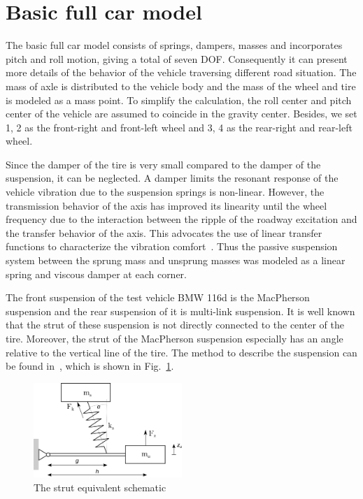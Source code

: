\section{Basic full car model}
\label{sec:full car model}
 
The basic full car model consists of springs, dampers, masses and incorporates pitch and roll motion, giving a total of seven \ac{DOF}.
%
Consequently it can present more details of the behavior of the vehicle traversing different road situation.
%
The mass of axle is distributed to the vehicle body and the mass of the wheel and tire is modeled as a mass point.
%
To simplify the calculation, the roll center and pitch center of the vehicle are assumed to coincide in the gravity center.
%
Besides, we set 1, 2 as the front-right and front-left wheel and 3, 4 as the rear-right and rear-left wheel.

Since the damper of the tire is very small compared to the damper of the suspension, it can be neglected.
%
A damper limits the resonant response of the vehicle vibration due to the suspension springs is non-linear.
%
However, the transmission behavior of the axis has improved its linearity until the wheel frequency due to the interaction between the ripple of the roadway excitation and the transfer behavior of the axis. 
%
This advocates the use of linear transfer functions to characterize the vibration comfort~\cite{iliev2014systemansatz}.
%
Thus the passive suspension system between the sprung mass and unsprung masses was modeled as a linear spring and viscous damper at each corner.

The front suspension of the test vehicle BMW 116d is the MacPherson suspension and the rear suspension of it is multi-link suspension.
%
It is well known that the strut of these suspension is not directly connected to the center of the tire.
%
Moreover, the strut of the MacPherson suspension especially has an angle relative to the vertical line of the tire.
%
The method to describe the suspension can be found in~\cite{jazar2008vehicle}, which is shown in Fig.~\ref{fig:susp}.

 \begin{figure}
 \centering
 \includegraphics[width=0.5\textwidth]{bilder/suspension.png}
 \caption{The strut equivalent schematic}
 \label{fig:susp}
 \end{figure}

